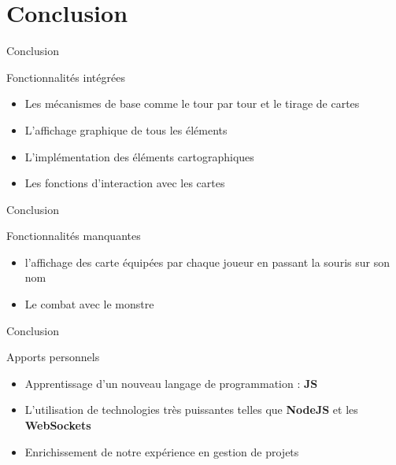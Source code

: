 \documentclass{bredelebeamer}
\begin{document}
\section{Conclusion}

\begin{frame}{Conclusion}
\begin{block}{Fonctionnalités intégrées}
    \begin{itemize}
      \item {Les mécanismes de base comme le tour par tour et le tirage de cartes}
      \pause
      \item {L’affichage graphique de tous les éléments}
      \pause
      \item {L’implémentation des éléments cartographiques}
      \pause
      \item {Les fonctions d’interaction avec les cartes}
    \end{itemize}
  \end{block}
\end{frame}

\begin{frame}{Conclusion}
\begin{block}{Fonctionnalités manquantes}
    \begin{itemize}
      \item {l’affichage des carte équipées par chaque joueur en passant la souris sur son nom}
      \pause
      \item {Le combat avec le monstre}
    \end{itemize}
  \end{block}
\end{frame}

\begin{frame}{Conclusion}
\begin{block}{Apports personnels}
\begin{itemize}
\item {Apprentissage d'un nouveau langage de programmation : \textbf{JS}}
\item {L'utilisation de technologies très puissantes telles que \textbf{NodeJS }et les \textbf{WebSockets}}
\item { Enrichissement de notre expérience en gestion de projets}
\end{itemize}
\end{block}
\end{frame}
\end{document}
